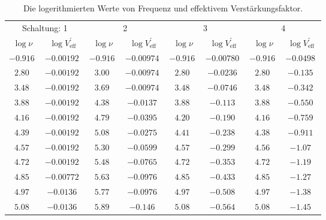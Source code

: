 \documentclass[
  bibliography=totoc,     %
  captions=tableheading,  %
  titlepage=firstiscover, %
]{scrartcl}
\begin{document}
\begin{table}
  \centering
  \caption{Die logerithmierten Werte von Frequenz und effektivem Verstärkungsfaktor.}
  \label{tab:logwerte}
  \begin{tabular}{c c c c c c c c}
    \toprule
    \multicolumn{2}{c}{Schaltung: 1} & \multicolumn{2}{c}{2} & \multicolumn{2}{c}{3} & \multicolumn{2}{c}{4} \\
    $\log{\nu}$ & $\log{V^\prime_\text{eff}}$ & $\log{\nu}$ & $\log{V^\prime_\text{eff}}$ & $\log{\nu}$ & $\log{V^\prime_\text{eff}}$ & $\log{\nu}$ & $\log{V^\prime_\text{eff}}$ \\
    \midrule
    $\SI{-0.916}{}$ & $\SI{-0.00192}{}$ & $\SI{-0.916}{}$ & $\SI{-0.00974}{}$ & $\SI{-0.916}{}$ & $\SI{-0.00780}{}$ & $\SI{-0.916}{}$ & $\SI{-0.0498}{}$ \\
    $\SI{ 2.80}{}$  & $\SI{-0.00192}{}$ & $\SI{ 3.00}{}$ & $\SI{-0.00974}{}$ & $\SI{ 2.80}{}$  & $\SI{-0.0236}{}$ & $\SI{ 2.80}{}$ & $\SI{-0.135}{}$  \\
    $\SI{ 3.48}{}$  & $\SI{-0.00192}{}$ & $\SI{ 3.69}{}$ & $\SI{-0.00974}{}$ & $\SI{ 3.48}{}$  & $\SI{-0.0746}{}$ & $\SI{ 3.48}{}$ & $\SI{-0.342}{}$  \\
    $\SI{ 3.88}{}$  & $\SI{-0.00192}{}$ & $\SI{ 4.38}{}$ & $\SI{-0.0137}{}$  & $\SI{ 3.88}{}$  & $\SI{-0.113}{}$ & $\SI{ 3.88}{}$ & $\SI{-0.550}{}$  \\
    $\SI{ 4.16}{}$  & $\SI{-0.00192}{}$ & $\SI{ 4.79}{}$ & $\SI{-0.0395}{}$  & $\SI{ 4.20}{}$  & $\SI{-0.190}{}$ & $\SI{ 4.16}{}$ & $\SI{-0.759}{}$  \\
    $\SI{ 4.39}{}$  & $\SI{-0.00192}{}$ & $\SI{ 5.08}{}$ & $\SI{-0.0275}{}$  & $\SI{ 4.41}{}$  & $\SI{-0.238}{}$ & $\SI{ 4.38}{}$ & $\SI{-0.911}{}$  \\
    $\SI{ 4.57}{}$  & $\SI{-0.00192}{}$ & $\SI{ 5.30}{}$ & $\SI{-0.0599}{}$  & $\SI{ 4.57}{}$  & $\SI{-0.299}{}$ & $\SI{ 4.56}{}$ & $\SI{-1.07}{}$   \\
    $\SI{ 4.72}{}$  & $\SI{-0.00192}{}$ & $\SI{ 5.48}{}$ & $\SI{-0.0765}{}$  & $\SI{ 4.72}{}$  & $\SI{-0.353}{}$ & $\SI{ 4.72}{}$ & $\SI{-1.19}{}$   \\
    $\SI{ 4.85}{}$  & $\SI{-0.00772}{}$ & $\SI{ 5.63}{}$ & $\SI{-0.0976}{}$  & $\SI{ 4.85}{}$  & $\SI{-0.433}{}$ & $\SI{ 4.85}{}$ & $\SI{-1.27}{}$   \\
    $\SI{ 4.97}{}$  & $\SI{-0.0136}{}$  & $\SI{ 5.77}{}$ & $\SI{-0.0976}{}$  & $\SI{ 4.97}{}$  & $\SI{-0.508}{}$ & $\SI{ 4.97}{}$ & $\SI{-1.38}{}$   \\
    $\SI{ 5.08}{}$  & $\SI{-0.0136}{}$  & $\SI{ 5.89}{}$ & $\SI{-0.146}{}$   & $\SI{ 5.08}{}$  & $\SI{-0.564}{}$ & $\SI{ 5.08}{}$ & $\SI{-1.45}{}$   \\

\end{tabular}
\end{table}
\end{document}

